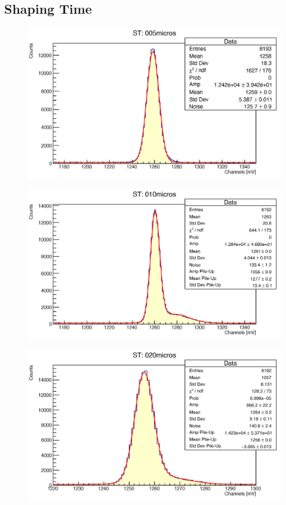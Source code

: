 \documentclass[a4paper,10pt]{article}
\begin{document}
\subsection{Shaping Time}
\begin{figure}[H]
    \centering
    \includegraphics[scale=0.45]{appendice/5}
\end{figure}
\begin{figure}[H]
    \centering
    \includegraphics[scale=0.45]{appendice/10}
\end{figure}
\begin{figure}[H]
    \centering
    \includegraphics[scale=0.45]{appendice/20}
\end{figure}
\end{document}
